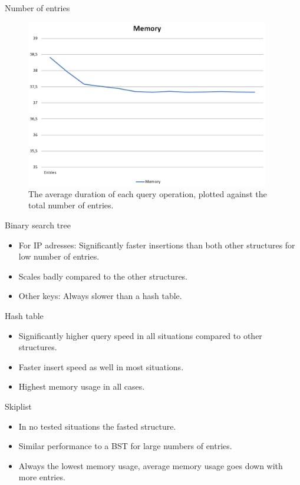 \documentclass[10pt]{beamer}
\begin{document}
\begin{frame}{Number of entries}
    \begin{figure}
      \centering
        \includegraphics[width=0.95\textwidth]{SkiplistMemory}
      \caption{The average duration of each query operation, plotted against the total number of entries.}
    \end{figure}
\end{frame}

\begin{frame}{Binary search tree}
    \begin{itemize}
        \item For IP adresses: Significantly faster insertions than both other structures for low number of entries.
        \item Scales badly compared to the other structures.
        \item Other keys: Always slower than a hash table.
    \end{itemize}
\end{frame}

\begin{frame}{Hash table}
    \begin{itemize}
        \item Significantly higher query speed in all situations compared to other structures.
        \item Faster insert speed as well in most situations.
        \item Highest memory usage in all cases.
    \end{itemize}
\end{frame}

\begin{frame}{Skiplist}
    \begin{itemize}
        \item In no tested situations the fasted structure.
        \item Similar performance to a BST for large numbers of entries.
        \item Always the lowest memory usage, average memory usage goes down with more entries.
    \end{itemize}
\end{frame}
\end{document}
